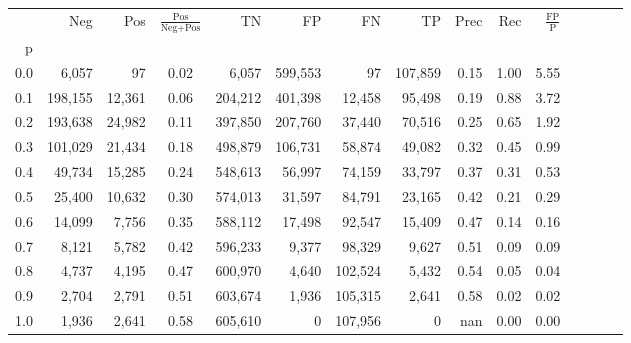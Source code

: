 \begin{tabular}{rrrcrrrrrrrrrrr}
\toprule
{} &      Neg &     Pos & $\frac{\text{Pos}}{\text{Neg}+\text{Pos}}$ &       TN &       FP &       FN &       TP &  Prec &   Rec & $\frac{\text{FP}}{\text{P}}$ \\
p   &          &         &                                            &          &          &          &          &       &       &                              \\
\midrule
0.0 &    6,057 &      97 &                                       0.02 &    6,057 &  599,553 &       97 &  107,859 &  0.15 &  1.00 &                         5.55 \\
0.1 &  198,155 &  12,361 &                                       0.06 &  204,212 &  401,398 &   12,458 &   95,498 &  0.19 &  0.88 &                         3.72 \\
0.2 &  193,638 &  24,982 &                                       0.11 &  397,850 &  207,760 &   37,440 &   70,516 &  0.25 &  0.65 &                         1.92 \\
0.3 &  101,029 &  21,434 &                                       0.18 &  498,879 &  106,731 &   58,874 &   49,082 &  0.32 &  0.45 &                         0.99 \\
0.4 &   49,734 &  15,285 &                                       0.24 &  548,613 &   56,997 &   74,159 &   33,797 &  0.37 &  0.31 &                         0.53 \\
0.5 &   25,400 &  10,632 &                                       0.30 &  574,013 &   31,597 &   84,791 &   23,165 &  0.42 &  0.21 &                         0.29 \\
0.6 &   14,099 &   7,756 &                                       0.35 &  588,112 &   17,498 &   92,547 &   15,409 &  0.47 &  0.14 &                         0.16 \\
0.7 &    8,121 &   5,782 &                                       0.42 &  596,233 &    9,377 &   98,329 &    9,627 &  0.51 &  0.09 &                         0.09 \\
0.8 &    4,737 &   4,195 &                                       0.47 &  600,970 &    4,640 &  102,524 &    5,432 &  0.54 &  0.05 &                         0.04 \\
0.9 &    2,704 &   2,791 &                                       0.51 &  603,674 &    1,936 &  105,315 &    2,641 &  0.58 &  0.02 &                         0.02 \\
1.0 &    1,936 &   2,641 &                                       0.58 &  605,610 &        0 &  107,956 &        0 &   nan &  0.00 &                         0.00 \\
\bottomrule
\end{tabular}
